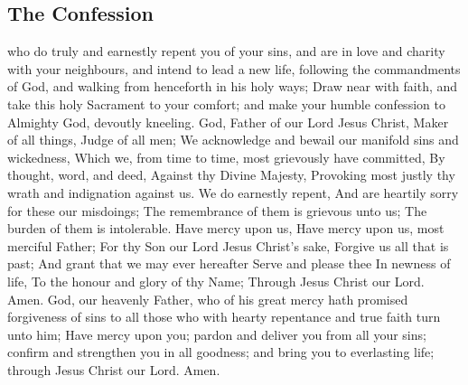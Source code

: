 \subsection{The Confession}
 who do truly and earnestly repent you of your sins, and are in love and charity with your neighbours, and intend to lead a new life, following the commandments of God, and walking from henceforth in his holy ways; Draw near with faith, and take this holy Sacrament to your comfort; and make your humble confession to Almighty God, devoutly kneeling.
 God, Father of our Lord Jesus Christ, Maker of all things, Judge of all men; We acknowledge and bewail our manifold sins and wickedness, Which we, from time to time, most grievously have committed, By thought, word, and deed, Against thy Divine Majesty, Provoking most justly thy wrath and indignation against us. We do earnestly repent, And are heartily sorry for these our misdoings; The remembrance of them is grievous unto us; The burden of them is intolerable. Have mercy upon us, Have mercy upon us, most merciful Father; For thy Son our Lord Jesus Christ’s sake, Forgive us all that is past; And grant that we may ever hereafter Serve and please thee In newness of life, To the honour and glory of thy Name; Through Jesus Christ our Lord. Amen.
 God, our heavenly Father, who of his great mercy hath promised forgiveness of sins to all those who with hearty repentance and true faith turn unto him; Have mercy upon you; pardon {} and deliver you from all your sins; confirm and strengthen you in all goodness; and bring you to everlasting life; through Jesus Christ our Lord. Amen.
